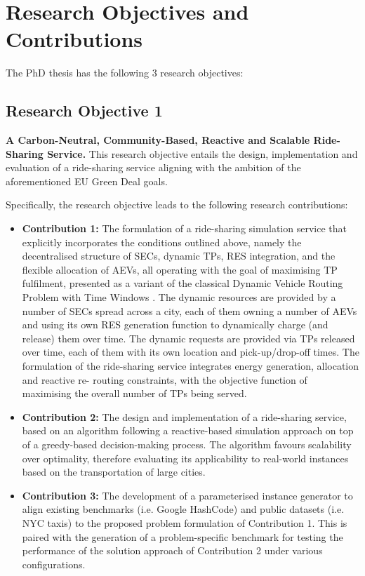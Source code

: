 \section{Research Objectives and Contributions}
\label{sec:contributions}
The PhD thesis has the following 3 research objectives:

\subsection{Research Objective 1}
\textbf{A Carbon-Neutral, Community-Based, Reactive and Scalable Ride-Sharing Service.}
This research objective entails the design, implementation and evaluation of a ride-sharing service aligning with the ambition of the aforementioned EU Green Deal goals.

Specifically, the research objective leads to the following research contributions:
\begin{itemize}
    \item \textbf{Contribution 1:} The formulation of a ride-sharing simulation service that explicitly incorporates the conditions outlined above, namely the decentralised structure of SECs, dynamic TPs, RES integration, and the flexible allocation of AEVs, all operating with the goal of maximising TP fulfilment, presented as a variant of the classical Dynamic Vehicle Routing Problem with Time Windows \cite{vrp_survey}. The dynamic resources are provided
    by a number of SECs spread across a city, each of them owning a number of AEVs
    and using its own RES generation function to dynamically charge (and release) them
    over time. The dynamic requests are provided via TPs released over time,
    each of them with its own location and pick-up/drop-off times. The formulation of
    the ride-sharing service integrates energy generation, allocation and reactive re-
    routing constraints, with the objective function of maximising the overall number of
    TPs being served.

    \item \textbf{Contribution 2:} The design and implementation of a ride-sharing service, based on an algorithm following a reactive-based simulation approach on top of a greedy-based decision-making process. The algorithm favours scalability over optimality, therefore evaluating its applicability to real-world instances based on the transportation of large cities.

    \item \textbf{Contribution 3:} The development of a parameterised instance generator to align existing benchmarks (i.e. Google HashCode) and public datasets (i.e. NYC taxis) to the proposed problem formulation of Contribution 1. This is paired with the generation
    of a problem-specific benchmark for testing the performance of the solution approach of Contribution 2 under various configurations.     
\end{itemize}

